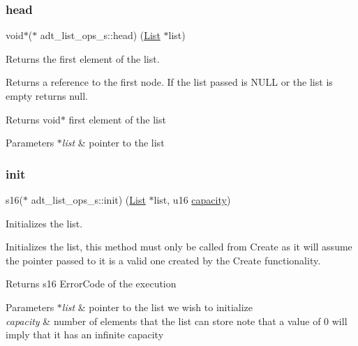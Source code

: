 \subsubsection{\texorpdfstring{head}{head}}
{\footnotesize\ttfamily void$\ast$($\ast$ adt\+\_\+list\+\_\+ops\+\_\+s\+::head) (\hyperlink{structadt__list__s}{List} $\ast$list)}



Returns the first element of the list. 

Returns a reference to the first node. If the list passed is N\+U\+LL or the list is empty returns null.

\begin{DoxyReturn}{Returns}
void$\ast$ first element of the list 
\end{DoxyReturn}

\begin{DoxyParams}{Parameters}
{\em $\ast$list} & pointer to the list \\
\hline
\end{DoxyParams}
\mbox{\label{structadt__list__ops__s_a7085f5015cf3ef89ede1dafa610d8513}} 
\subsubsection{\texorpdfstring{init}{init}}
{\footnotesize\ttfamily s16($\ast$ adt\+\_\+list\+\_\+ops\+\_\+s\+::init) (\hyperlink{structadt__list__s}{List} $\ast$list, u16 \hyperlink{structadt__list__ops__s_a739fb8b630a36bcffd0182c82b6eaa9a}{capacity})}



Initializes the list. 

Initializes the list, this method must only be called from Create as it will assume the pointer passed to it is a valid one created by the Create functionality.

\begin{DoxyReturn}{Returns}
s16 Error\+Code of the execution 
\end{DoxyReturn}

\begin{DoxyParams}{Parameters}
{\em $\ast$list} & pointer to the list we wish to initialize \\
\hline
{\em capacity} & number of elements that the list can store note that a value of 0 will imply that it has an infinite capacity \\
\hline
\end{DoxyParams}
\mbox{\label{structadt__list__ops__s_a03f60098bf5144cfdc2e042b6f5d032e}} 
